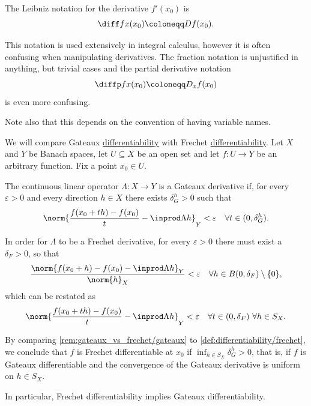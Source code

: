\begin{remark}
\begin{thmenum}
     The Leibniz notation for the derivative \( f'(x_0) \) is
    \begin{equation*}
      \diff f x (x_0) \coloneqq D f(x_0).
    \end{equation*}

    This notation is used extensively in integral calculus, however it is often confusing when manipulating derivatives. The fraction notation is unjustified in anything, but trivial cases and the partial derivative notation
    \begin{equation*}
      \diffp f x (x_0) \coloneqq D_x f(x_0)
    \end{equation*}
    is even more confusing.

    Note also that this depends on the convention of having variable names.
  \end{thmenum}
\end{remark}

\begin{remark}\label{rem:gateaux_vs_frechet}
  We will compare Gateaux \hyperref[def:differentiability/gateaux]{differentiability} with Frechet \hyperref[def:differentiability/frechet]{differentiability}. Let \( X \) and \( Y \) be Banach spaces, let \( U \subseteq X \) be an open set and let \( f: U \to Y \) be an arbitrary function. Fix a point \( x_0 \in U \).

  The continuous linear operator \( \Lambda: X \to Y \) is a Gateaux derivative if, for every \( \varepsilon > 0 \) and every direction \( h \in X \) there exists \( \delta_G^h > 0 \) such that
  \begin{equation}\label{rem:gateaux_vs_frechet/gateaux}
    \norm{\frac {f(x_0 + th) - f(x_0)} t - \inprod \Lambda h}_Y < \varepsilon \quad\forall t \in (0, \delta_G^h).
  \end{equation}

  In order for \( \Lambda \) to be a Frechet derivative, for every \( \varepsilon > 0 \) there must exist a \( \delta_F > 0 \), so that
  \begin{equation*}
    \frac{\norm{f(x_0 + h) - f(x_0) - \inprod \Lambda h}_Y} {\norm{h}_X} < \varepsilon \quad\forall h \in B(0, \delta_F) \setminus \{ 0 \},
  \end{equation*}
  which can be restated as
  \begin{equation}\label{rem:gateaux_vs_frechet/frechet}
    \norm{\frac {f(x_0 + th) - f(x_0)} t - \inprod \Lambda h}_Y < \varepsilon \quad\forall t \in (0, \delta_F) \ \forall h \in S_X.
  \end{equation}

  By comparing \cref{rem:gateaux_vs_frechet/gateaux} to \cref{def:differentiability/frechet}, we conclude that \( f \) is Frechet differentiable at \( x_0 \) if \( \inf_{h \in S_X} \delta^h_G > 0 \), that is, if \( f \) is Gateaux differentiable and the convergence of the Gateaux derivative is uniform on \( h \in S_X \).

  In particular, Frechet differentiability implies Gateaux differentiability.
\end{remark}

